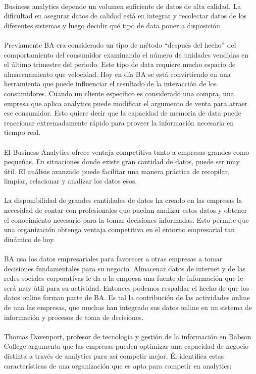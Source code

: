 \begin{enumerate}[3.]
\\
Business analytics depende un volumen suficiente de datos de alta calidad. La dificultad en asegurar datos de calidad está en integrar y recolectar datos de los diferentes sistemas y luego decidir qué tipo de data poner a disposición.
\\
\\
Previamente BA era considerado un tipo de método “después del hecho” del comportamiento del consumidor examinando el número de unidades vendidas en el último trimestre del periodo. Este tipo de data requiere mucho espacio de almacenamiento que velocidad. Hoy en día BA se está convirtiendo en una herramienta que puede influenciar el resultado de la interacción de los consumidores. Cuando un cliente específico es considerado una compra, una empresa que aplica analytics puede modificar el argumento de venta para atraer ese consumidor. Esto quiere decir que la capacidad de memoria de data puede reaccionar extremadamente rápido para proveer la información necesaria en tiempo real.
\\
\\
El Business Analytics ofrece ventaja competitiva tanto a empresas grandes como pequeñas. En situaciones donde existe gran cantidad de datos, puede ser muy útil. El análisis avanzado puede facilitar una manera práctica de recopilar, limpiar, relacionar y analizar los datos esos.
\\
\\
La disponibilidad de grandes cantidades de datos ha creado en las empresas la necesidad de contar con profesionales que puedan analizar estos datos y obtener el conocimiento necesario para la tomar decisiones informadas. Esto permite que una organización obtenga ventaja competitiva en el entorno empresarial tan dinámico de hoy.
\\
\\
BA usa los datos empresariales para favorecer a otras empresas a tomar decisiones fundamentales para su negocio. Almacenar datos de internet y de las redes sociales corporativas le da a la empresa una fuente de información que le será muy útil para su actividad. Entonces podemos respaldar el hecho de que los datos online forman parte de BA. Es tal la contribución de las actividades online de una las empresas, que muchas han integrado sus datos online en un sistema de información y procesos de toma de decisiones.
\\
\\
Thomas Davenport, profesor de tecnología y gestión de la información en Babson College argumenta que las empresas pueden optimizar una capacidad de negocio distinta a través de analytics para así competir mejor. Él identifica estas características de una organización que es apta para competir en analytics:


\end{enumerate}
